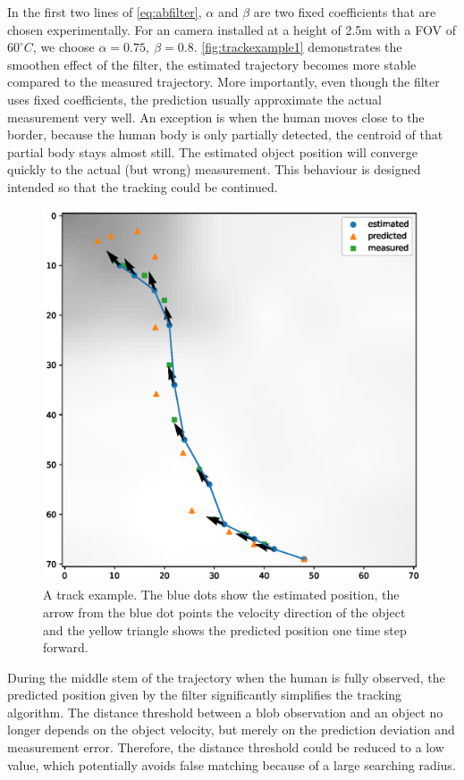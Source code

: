 In the first two lines of \autoref{eq:abfilter}, $\alpha$ and $\beta$ are two fixed coefficients that are chosen experimentally. For an camera installed at a height of 2.5m with a FOV of $60^\circ C$, we choose $\alpha=0.75,\ \beta=0.8$. \autoref{fig:trackexample1} demonstrates the smoothen effect of the filter, the estimated trajectory becomes more stable compared to the measured trajectory. More importantly, even though the filter uses fixed coefficients, the prediction usually approximate the actual measurement very well. An exception is when the human moves close to the border, because the human body is only partially detected, the centroid of that partial body stays almost still. The estimated object position will converge quickly to the actual (but wrong) measurement. This behaviour is designed intended so that the tracking could be continued.
\begin{figure}
  \centering
  \includegraphics[width=\textwidth]{figures/trackexample1.eps}
  \caption{A track example. The blue dots show the estimated position, the arrow from the blue dot points the velocity direction of the object and the yellow triangle shows the predicted position one time step forward.}\label{fig:trackexample1}
\end{figure}

During the middle stem of the trajectory when the human is fully observed, the predicted position given by the filter significantly simplifies the tracking algorithm. The distance threshold between a blob observation and an object no longer depends on the object velocity, but merely on the prediction deviation and measurement error. Therefore, the distance threshold could be reduced to a low value, which potentially avoids false matching because of a large searching radius.

